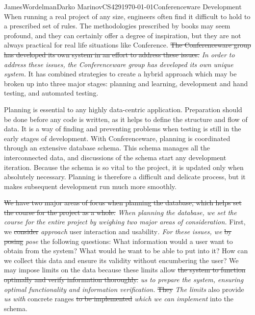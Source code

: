 \documentclass[12pt,letterpaper]{article}
\begin{document}
\begin{mla}{James}{Wordelman}{Darko Marinov}{CS429}{\today}{Conferenceware
Development}
When running a real project of any size, engineers often find it difficult to hold to a prescribed set of rules. The methodologies prescribed by books may seem profound, and they can certainly offer a degree of inspiration, but they are not always practical for real life situations like Conference. \sout{The Conferenceware group has developed its own system in an effort to address these issues.} \textit{In order to address these issues, the Conferenceware group has developed its own unique system.} It has combined strategies to create a hybrid approach which may be broken up into three major stages: planning and learning, development and hand testing, and automated testing. 

Planning is essential to any highly data-centric application. Preparation should be done before any code is written, as it helps to define the structure and flow of data. It is a way of finding and preventing problems when testing is still in the early stages of development. With Conferenceware, planning is coordinated through an extensive database schema. This schema manages all the interconnected data, and discussions of the schema start any development iteration. Because the schema is so vital to the project, it is updated only when absolutely necessary.  Planning is therefore a difficult and delicate process, but it makes subsequent development run much more smoothly.

\sout{We have two major areas of focus when planning the database, which helps set the course for the project as a whole.} \textit{When planning the database, we set the course for the entire project by weighing two major areas of consideration.} First, we \sout{consider} \textit{approach} user interaction and usability\textit{. For these issues, we} \sout{by posing} \textit{pose} the following questions: What information would a user want to obtain from the system? What would he want to be able to put into it? How can we collect this data and ensure its validity without encumbering the user?  We may impose limits on the data because these limits allow \sout{the system to function optimally and verify information thoroughly.} \textit{us to prepare the system, ensuring optimal functionality and information verification.} \sout{They} \textit{The limits} also provide \textit{us with} concrete ranges \sout{to be implemented} \textit{which we can implement} into the schema. 


\end{mla}
\end{document}
